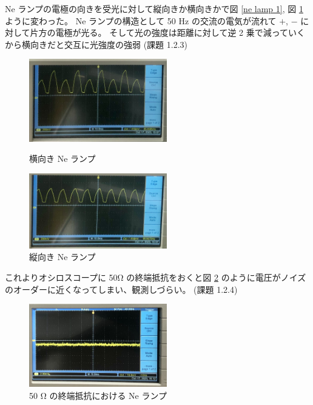 \documentclass[uplatex,dvipdfmx,a4paper,11pt]{jlreq}
\numberwithin{equation}{section}
\theoremstyle{definition}
\begin{document}
Ne ランプの電極の向きを受光に対して縦向きか横向きかで図 \ref{ne lamp 1}, 図 \ref{ne lamp 2} ように変わった。
Ne ランプの構造として 50 Hz の交流の電気が流れて $+$, $-$ に対して片方の電極が光る。
そして光の強度は距離に対して逆 2 乗で減っていくから横向きだと交互に光強度の強弱 (課題 1.2.3) \\
\begin{figure}[htbp]
  \begin{minipage}[b]{0.5\linewidth}
    \centering
    \includegraphics[width=6cm]{./assets/ne_lamp1.jpg}
    \caption{横向き Ne ランプ}
    \label{ne lamp 1}
  \end{minipage}
  \begin{minipage}[b]{0.5\linewidth}
    \centering
    \includegraphics[width=6cm]{./assets/ne_lamp2.jpg}
    \caption{縦向き Ne ランプ}
    \label{ne lamp 2}
  \end{minipage}
\end{figure}

これよりオシロスコープに 50\si{\ohm} の終端抵抗をおくと図 \ref{noise} のように電圧がノイズのオーダーに近くなってしまい、観測しづらい。
(課題 1.2.4)

\begin{figure}[htbp]
  \centering
  \includegraphics[width=6cm]{./assets/noise.jpg}
  \caption{50 \si{\ohm} の終端抵抗における Ne ランプ}
  \label{noise}
\end{figure}
\end{document}
